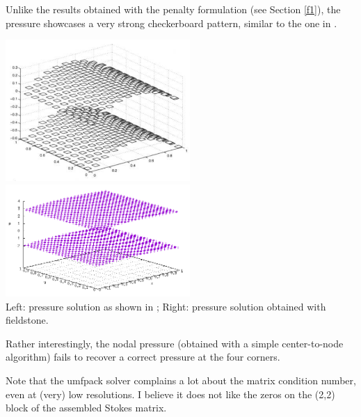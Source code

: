 Unlike the results obtained with the penalty formulation (see Section \ref{f1}),
the pressure showcases a very strong checkerboard pattern, similar to the one 
in \cite{dohu03}.

\begin{center}
\includegraphics[width=7cm]{python_codes/fieldstone_14/doneahuerta}
\includegraphics[width=7cm]{python_codes/fieldstone_14/mine}\\
{\captionfont Left: pressure solution as shown in \cite{dohu03}; Right: pressure solution obtained
with fieldstone.}
\end{center}

Rather interestingly, the nodal pressure (obtained with a simple center-to-node algorithm)
fails to recover a correct pressure at the four corners.

Note that the umfpack solver complains a lot about the matrix condition number, 
even at (very) low resolutions. I believe it does not like the zeros on the (2,2)
block of the assembled Stokes matrix. 
